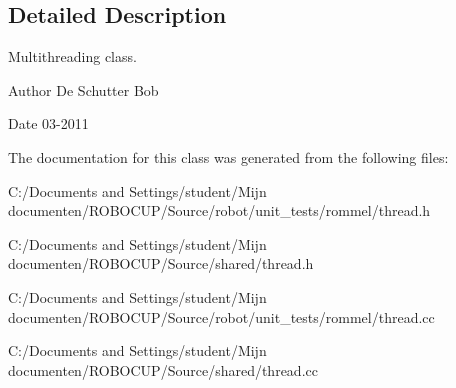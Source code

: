 \subsection{Detailed Description}
Multithreading class. 

\begin{DoxyAuthor}{Author}
De Schutter Bob 
\end{DoxyAuthor}
\begin{DoxyDate}{Date}
03-\/2011 
\end{DoxyDate}


The documentation for this class was generated from the following files\-:\begin{DoxyCompactItemize}
\item 
C\-:/\-Documents and Settings/student/\-Mijn documenten/\-R\-O\-B\-O\-C\-U\-P/\-Source/robot/unit\-\_\-tests/rommel/thread.\-h\item 
C\-:/\-Documents and Settings/student/\-Mijn documenten/\-R\-O\-B\-O\-C\-U\-P/\-Source/shared/thread.\-h\item 
C\-:/\-Documents and Settings/student/\-Mijn documenten/\-R\-O\-B\-O\-C\-U\-P/\-Source/robot/unit\-\_\-tests/rommel/thread.\-cc\item 
C\-:/\-Documents and Settings/student/\-Mijn documenten/\-R\-O\-B\-O\-C\-U\-P/\-Source/shared/thread.\-cc\end{DoxyCompactItemize}
